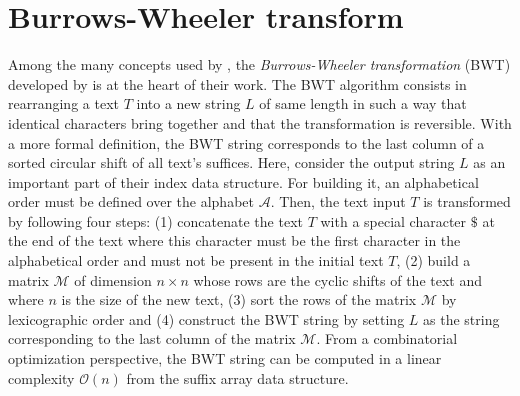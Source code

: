 \documentclass[11pt,twoside]{article}
\theoremstyle{definition}
\begin{document}
\section{Burrows-Wheeler transform}\label{sec:concepts}

Among the many concepts used by \citet{Ferragina-2005}, the \textit{Burrows-Wheeler transformation} (BWT) developed by \citet{Burrows-1994} is at the heart of their work. The BWT algorithm consists in rearranging a text $T$ into a new string $L$ of same length in such a way that identical characters bring together and that the transformation is reversible. With a more formal definition, the BWT string corresponds to the last column of a sorted circular shift of all text's suffices. Here, \citet{Ferragina-2005} consider the output string $L$ as an important part of their index data structure. For building it, an alphabetical order must be defined over the alphabet $\mathcal{A}$. Then, the text input $T$ is transformed by following four steps: (1) concatenate the text $T$ with a special character $\$$ at the end of the text where this character must be the first character in the alphabetical order and must not be present in the initial text $T$, (2) build a matrix $\mathcal{M}$ of dimension $n \times n$ whose rows are the cyclic shifts of the text and where $n$ is the size of the new text, (3) sort the rows of the matrix $\mathcal{M}$ by lexicographic order and (4) construct the BWT string by setting $L$ as the string corresponding to the last column of the matrix $\mathcal{M}$. From a combinatorial optimization perspective, the BWT string can be computed in a linear complexity $\mathcal{O}\left(n\right)$ from the suffix array data structure.
\end{document}
